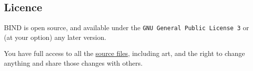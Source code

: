 \begin{multicols}{2}
\subsection*{Licence}

BIND is open source, and available under the {\tt GNU General Public License 3} or (at your option) any later version.

You have full access to all the \href{https://gitlab.com/bindrpg/core}{source files}, including art, and the right to change anything and share those changes with others.

\end{multicols}
